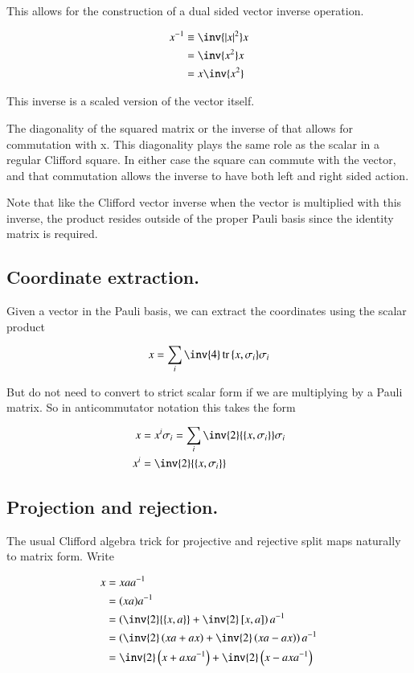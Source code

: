 \documentclass{article}
\DeclareMathOperator{\tr}{tr}
\newcommand{\trace}[1]{\tr{#1}}
\newcommand{\symmetric}[2]{{\left\{{#1},{#2}\right\}}}
\newcommand{\antisymmetric}[2]{\left[{#1},{#2}\right]}
\begin{document}
This allows for the construction of a dual sided vector inverse operation.

\begin{align*}
x^{-1}
&\equiv \inv{\Abs{x}^2} x \\
&= \inv{x^2} x \\
&= x \inv{x^2} \\
\end{align*}

This inverse is a scaled version of the vector itself.

The diagonality of the squared matrix or the inverse of that allows for commutation with x.  This diagonality plays the same role as the scalar in a regular Clifford square.  In either case the square can commute with the vector, and that 
commutation allows the inverse to have both left and right sided action.

Note that like the Clifford vector inverse when the vector is multiplied with this inverse, the product resides outside of the proper  Pauli basis since the identity matrix is required.

\subsection{ Coordinate extraction. }

Given a vector in the Pauli basis, we can extract the coordinates using the scalar product

\begin{align*}
x = \sum_i \inv{4}\trace{\symmetric{x}{\sigma_i}} \sigma_i
\end{align*}

But do not need to convert to strict scalar form if we are multiplying by a Pauli matrix.  So in anticommutator notation
this takes the form

\begin{align*}
x &= x^i \sigma_i = \sum_i \inv{2}\symmetric{x}{\sigma_i} \sigma_i \\
x^i &= \inv{2}\symmetric{x}{\sigma_i}
\end{align*}

\subsection{ Projection and rejection. }

The usual Clifford algebra trick for projective and rejective split maps naturally to matrix form.  Write

\begin{align*}
x 
&= x a a^{-1} \\
&= (x a) a^{-1} \\
&= \left( \inv{2}\symmetric{x}{a} + \inv{2}\antisymmetric{x}{a} \right) a^{-1} \\
&= \left( \inv{2}\left(x a + a x \right) + \inv{2} \left(x a - a x \right) \right) a^{-1} \\
&= \inv{2}\left(x + a x a^{-1} \right) + \inv{2} \left(x - a x a^{-1} \right) \\
\end{align*}
\end{document}
